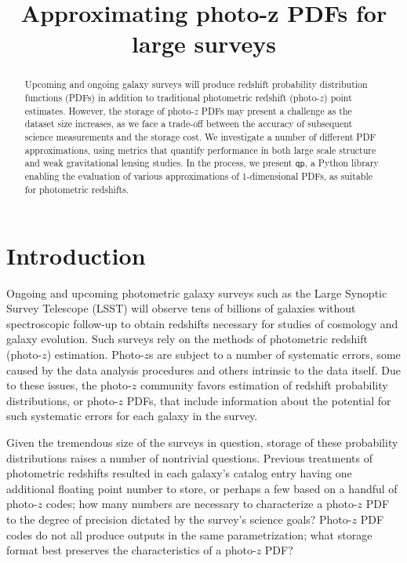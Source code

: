 \documentclass[\docopts]{\docclass}
\newcommand{\qp}{\texttt{qp}}
\begin{document}
\title{ Approximating photo-z PDFs for large surveys }


\begin{abstract}

Upcoming and ongoing galaxy surveys will produce redshift probability 
distribution functions (PDFs) in addition to traditional photometric redshift 
(photo-$z$) point estimates.  However, the storage of photo-$z$ PDFs may 
present a challenge as the dataset size increases, as we face a trade-off 
between the accuracy of subsequent science measurements and the storage cost. 
We investigate a number of different PDF approximations, using metrics that 
quantify performance in both large scale structure and weak gravitational 
lensing studies. In the process, we present \qp, a Python library enabling the 
evaluation of various approximations of 1-dimensional PDFs, as suitable for 
photometric redshifts.

\end{abstract}






\section{Introduction}
\label{sec:intro}


Ongoing and upcoming photometric galaxy surveys such as the Large Synoptic 
Survey Telescope (LSST) will observe tens of billions of galaxies without 
spectroscopic follow-up to obtain redshifts necessary for studies of cosmology 
and galaxy evolution.  Such surveys rely on the methods of photometric redshift 
(photo-$z$) estimation.  Photo-$z$s are subject to a number of systematic 
errors, some caused by the data analysis procedures and others intrinsic to the 
data itself.  Due to these issues, the photo-$z$ community favors estimation of 
redshift probability distributions, or photo-$z$ PDFs, that include information 
about the potential for such systematic errors for each galaxy in the survey.

Given the tremendous size of the surveys in question, storage of these 
probability distributions raises a number of nontrivial questions.  Previous 
treatments of photometric redshifts resulted in each galaxy's catalog entry 
having one additional floating point number to store, or perhaps a few based on 
a handful of photo-$z$ codes; how many numbers are necessary to characterize a 
photo-$z$ PDF to the degree of precision dictated by the survey's science 
goals?  Photo-$z$ PDF codes do not all produce outputs in the same 
parametrization; what storage format best preserves the characteristics of a 
photo-$z$ PDF?
\end{document}
